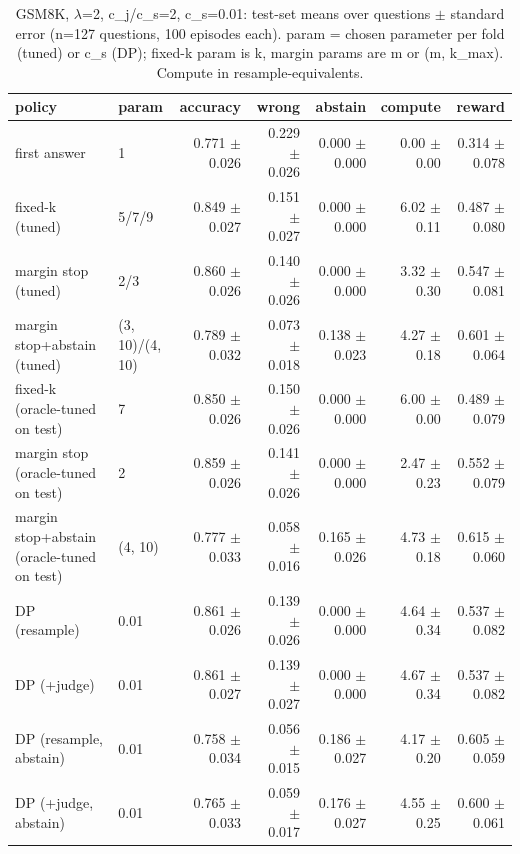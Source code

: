 \begin{table}[t]
\centering
\small
\caption{GSM8K, $\lambda$=2, c\_j/c\_s=2, c\_s=0.01: test-set means over questions $\pm$ standard error (n=127 questions, 100 episodes each). param = chosen parameter per fold (tuned) or c\_s (DP); fixed-k param is k, margin params are m or (m, k\_max). Compute in resample-equivalents.}
\label{tab:headline_gsm8k_lam2_jr2}
\begin{tabular}{llrrrrr}
\toprule
policy & param & accuracy & wrong & abstain & compute & reward \\
\midrule
first answer & 1 & 0.771 $\pm$ 0.026 & 0.229 $\pm$ 0.026 & 0.000 $\pm$ 0.000 & 0.00 $\pm$ 0.00 & 0.314 $\pm$ 0.078 \\
fixed-k (tuned) & 5/7/9 & 0.849 $\pm$ 0.027 & 0.151 $\pm$ 0.027 & 0.000 $\pm$ 0.000 & 6.02 $\pm$ 0.11 & 0.487 $\pm$ 0.080 \\
margin stop (tuned) & 2/3 & 0.860 $\pm$ 0.026 & 0.140 $\pm$ 0.026 & 0.000 $\pm$ 0.000 & 3.32 $\pm$ 0.30 & 0.547 $\pm$ 0.081 \\
margin stop+abstain (tuned) & (3, 10)/(4, 10) & 0.789 $\pm$ 0.032 & 0.073 $\pm$ 0.018 & 0.138 $\pm$ 0.023 & 4.27 $\pm$ 0.18 & 0.601 $\pm$ 0.064 \\
fixed-k (oracle-tuned on test) & 7 & 0.850 $\pm$ 0.026 & 0.150 $\pm$ 0.026 & 0.000 $\pm$ 0.000 & 6.00 $\pm$ 0.00 & 0.489 $\pm$ 0.079 \\
margin stop (oracle-tuned on test) & 2 & 0.859 $\pm$ 0.026 & 0.141 $\pm$ 0.026 & 0.000 $\pm$ 0.000 & 2.47 $\pm$ 0.23 & 0.552 $\pm$ 0.079 \\
margin stop+abstain (oracle-tuned on test) & (4, 10) & 0.777 $\pm$ 0.033 & 0.058 $\pm$ 0.016 & 0.165 $\pm$ 0.026 & 4.73 $\pm$ 0.18 & 0.615 $\pm$ 0.060 \\
DP (resample) & 0.01 & 0.861 $\pm$ 0.026 & 0.139 $\pm$ 0.026 & 0.000 $\pm$ 0.000 & 4.64 $\pm$ 0.34 & 0.537 $\pm$ 0.082 \\
DP (+judge) & 0.01 & 0.861 $\pm$ 0.027 & 0.139 $\pm$ 0.027 & 0.000 $\pm$ 0.000 & 4.67 $\pm$ 0.34 & 0.537 $\pm$ 0.082 \\
DP (resample, abstain) & 0.01 & 0.758 $\pm$ 0.034 & 0.056 $\pm$ 0.015 & 0.186 $\pm$ 0.027 & 4.17 $\pm$ 0.20 & 0.605 $\pm$ 0.059 \\
DP (+judge, abstain) & 0.01 & 0.765 $\pm$ 0.033 & 0.059 $\pm$ 0.017 & 0.176 $\pm$ 0.027 & 4.55 $\pm$ 0.25 & 0.600 $\pm$ 0.061 \\
\bottomrule
\end{tabular}
\end{table}
